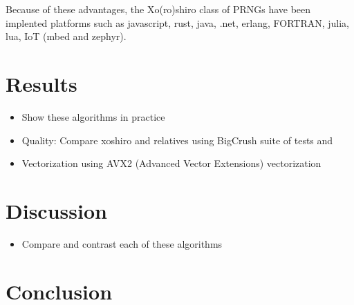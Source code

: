 \documentclass{article}
\begin{document}
            Because of these advantages, the Xo(ro)shiro class of PRNGs have been implented platforms such as javascript, rust, java, .net, erlang, FORTRAN, julia, lua, IoT (mbed and zephyr).

    \section*{Results}

        \begin{itemize}
            \item Show these algorithms in practice
            \item Quality\cite{Shootout}: Compare xoshiro and relatives using BigCrush suite of tests\cite{TestU01} and\cite{HammingWeightDependencies}
            \item Vectorization using AVX2 (Advanced Vector Extensions) vectorization\cite{Shootout}
        \end{itemize}

    \section*{Discussion}

        \begin{itemize}
            \item Compare and contrast each of these algorithms
        \end{itemize}

    \section*{Conclusion}
    
    \newpage
    \printbibliography
\end{document}
